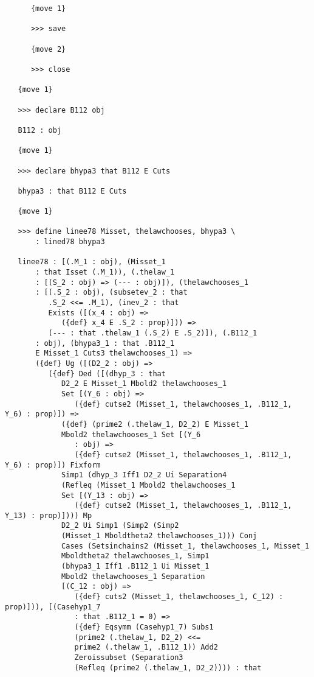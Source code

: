 \documentclass[12pt]{article}
\begin{document}
\begin{verbatim}
      {move 1}

      >>> save

      {move 2}

      >>> close

   {move 1}

   >>> declare B112 obj

   B112 : obj

   {move 1}

   >>> declare bhypa3 that B112 E Cuts

   bhypa3 : that B112 E Cuts

   {move 1}

   >>> define linee78 Misset, thelawchooses, bhypa3 \
       : lined78 bhypa3

   linee78 : [(.M_1 : obj), (Misset_1 
       : that Isset (.M_1)), (.thelaw_1 
       : [(S_2 : obj) => (--- : obj)]), (thelawchooses_1 
       : [(.S_2 : obj), (subsetev_2 : that 
          .S_2 <<= .M_1), (inev_2 : that 
          Exists ([(x_4 : obj) => 
             ({def} x_4 E .S_2 : prop)])) => 
          (--- : that .thelaw_1 (.S_2) E .S_2)]), (.B112_1 
       : obj), (bhypa3_1 : that .B112_1 
       E Misset_1 Cuts3 thelawchooses_1) => 
       ({def} Ug ([(D2_2 : obj) => 
          ({def} Ded ([(dhyp_3 : that 
             D2_2 E Misset_1 Mbold2 thelawchooses_1 
             Set [(Y_6 : obj) => 
                ({def} cutse2 (Misset_1, thelawchooses_1, .B112_1, Y_6) : prop)]) => 
             ({def} (prime2 (.thelaw_1, D2_2) E Misset_1 
             Mbold2 thelawchooses_1 Set [(Y_6 
                : obj) => 
                ({def} cutse2 (Misset_1, thelawchooses_1, .B112_1, Y_6) : prop)]) Fixform 
             Simp1 (dhyp_3 Iff1 D2_2 Ui Separation4 
             (Refleq (Misset_1 Mbold2 thelawchooses_1 
             Set [(Y_13 : obj) => 
                ({def} cutse2 (Misset_1, thelawchooses_1, .B112_1, Y_13) : prop)]))) Mp 
             D2_2 Ui Simp1 (Simp2 (Simp2 
             (Misset_1 Mboldtheta2 thelawchooses_1))) Conj 
             Cases (Setsinchains2 (Misset_1, thelawchooses_1, Misset_1 
             Mboldtheta2 thelawchooses_1, Simp1 
             (bhypa3_1 Iff1 .B112_1 Ui Misset_1 
             Mbold2 thelawchooses_1 Separation 
             [(C_12 : obj) => 
                ({def} cuts2 (Misset_1, thelawchooses_1, C_12) : prop)])), [(Casehyp1_7 
                : that .B112_1 = 0) => 
                ({def} Eqsymm (Casehyp1_7) Subs1 
                (prime2 (.thelaw_1, D2_2) <<= 
                prime2 (.thelaw_1, .B112_1)) Add2 
                Zeroissubset (Separation3 
                (Refleq (prime2 (.thelaw_1, D2_2)))) : that 

\end{verbatim}
\end{document}
